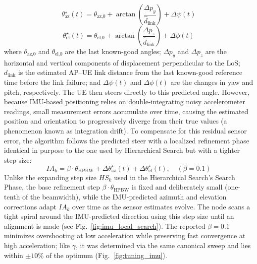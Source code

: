 \documentclass[fleqn,10pt]{wlscirep}
\newcommand{\rev}[1]{{\color{revblue}#1}}
\begin{document}
\begin{equation}
    \theta_{\text{az}}^{\star}(t) = \theta_{\text{az,0}} + \arctan\!\left(\frac{\Delta p_{y}}{\hat{d}_{\text{link}}}\right) + \Delta\psi(t)
\end{equation}
\begin{equation}
    \theta_{\text{el}}^{\star}(t) = \theta_{\text{el,0}} + \arctan\!\left(\frac{\Delta p_{z}}{\hat{d}_{\text{link}}}\right) + \Delta\phi(t)
\end{equation}
where $\theta_{\text{az,0}}$ and $\theta_{\text{el,0}}$ are the last known-good angles; $\Delta p_y$ and $\Delta p_z$ are the horizontal and vertical components of displacement perpendicular to the LoS; $d_{\text{link}}$ is the estimated AP--UE link distance from the last known-good reference time before the link failure; and $\Delta\psi(t)$ and $\Delta\phi(t)$ are the changes in yaw and pitch, respectively. The UE then steers directly to this predicted angle. However, because IMU-based positioning relies on double-integrating noisy accelerometer readings, small measurement errors accumulate over time, causing the estimated position and orientation to progressively diverge from their true values (a phenomenon known as integration drift). To compensate for this residual sensor error, the algorithm follows the predicted steer with a localized refinement phase identical in purpose to the one used by Hierarchical Search but with a tighter step size:
\begin{equation}
    IA_k = \beta \cdot \theta_{\text{HPBW}} + \Delta\theta_{\text{az}}^{\star}(t) + \Delta\theta_{\text{el}}^{\star}(t), \quad (\beta = 0.1)
\end{equation}
Unlike the expanding step size $HS_k$ used in the Hierarchical Search's Search Phase, the base refinement step $\beta \cdot \theta_{\text{HPBW}}$ is fixed and deliberately small (one-tenth of the beamwidth), while the IMU-predicted azimuth and elevation corrections adapt $IA_k$ over time as the sensor estimates evolve. The node scans a tight spiral around the IMU-predicted direction using this step size until an alignment is made (see Fig.~\ref{fig:imu_local_search}). \rev{The reported $\beta = 0.1$ minimizes overshooting at low acceleration while preserving fast convergence at high acceleration; like $\gamma$, it was determined via the same canonical sweep and lies within $\pm 10\%$ of the optimum (Fig.~\ref{fig:tuning_imu}).}
\end{document}
